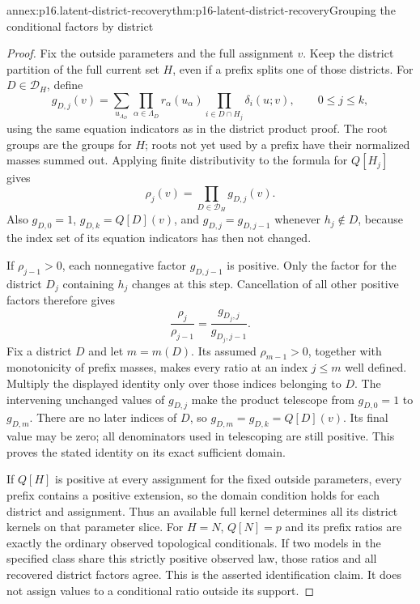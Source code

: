 \begin{annexitem}{annex:p16.latent-district-recovery}{thm:p16-latent-district-recovery}{Grouping the conditional factors by district}
\begin{proof}
Fix the outside parameters and the full assignment \(v\). Keep
the district partition of the full current set \(H\), even if
a prefix splits one of those districts. For \(D\in\mathcal D_H\),
define
\[
 g_{D,j}(v)=\sum_{u_{\Lambda_D}}
       \prod_{\alpha\in\Lambda_D}r_\alpha(u_\alpha)
       \prod_{i\in D\cap H_j}\delta_i(u;v),
 \qquad 0\leq j\leq k,
\]
using the same equation indicators as in the district product proof.
The root groups are the groups for \(H\); roots not yet used
by a prefix have their normalized masses summed out. Applying finite
distributivity to the formula for \(Q[H_j]\) gives
\[
 \rho_j(v)=\prod_{D\in\mathcal D_H}g_{D,j}(v).
\]
Also \(g_{D,0}=1\), \(g_{D,k}=Q[D](v)\), and
\(g_{D,j}=g_{D,j-1}\) whenever \(h_j\notin D\), because
the index set of its equation indicators has then not changed.

If \(\rho_{j-1}>0\), each nonnegative factor \(g_{D,j-1}\)
is positive. Only the factor for the district \(D_j\) containing
\(h_j\) changes at this step. Cancellation of all other positive
factors therefore gives
\[
 \frac{\rho_j}{\rho_{j-1}}
      =\frac{g_{D_j,j}}{g_{D_j,j-1}}.
\]
Fix a district \(D\) and let \(m=m(D)\). Its assumed
\(\rho_{m-1}>0\), together with monotonicity of prefix masses,
makes every ratio at an index \(j\leq m\) well defined.
Multiply the displayed identity only over those indices belonging
to \(D\). The intervening unchanged values of \(g_{D,j}\)
make the product telescope from \(g_{D,0}=1\) to \(g_{D,m}\).
There are no later indices of \(D\), so
\(g_{D,m}=g_{D,k}=Q[D](v)\). Its final value may be zero;
all denominators used in telescoping are still positive. This proves
the stated identity on its exact sufficient domain.

If \(Q[H]\) is positive at every assignment for the fixed
outside parameters, every prefix contains a positive extension,
so the domain condition holds for each district and assignment.
Thus an available full kernel determines all its district kernels
on that parameter slice. For \(H=N\), \(Q[N]=p\) and its
prefix ratios are exactly the ordinary observed topological
conditionals. If two models in the specified class share this
strictly positive observed law, those ratios and all recovered
district factors agree. This is the asserted identification claim.
It does not assign values to a conditional ratio outside its support.
\end{proof}
\end{annexitem}

